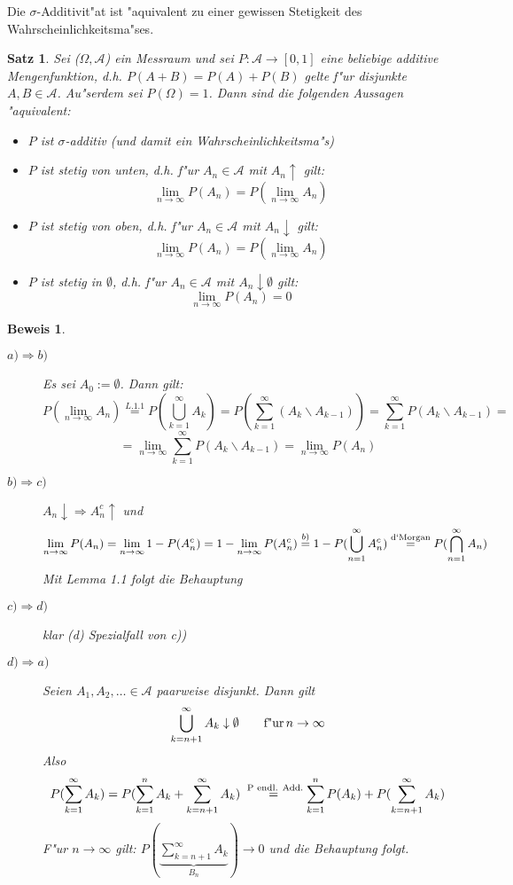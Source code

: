 \documentclass[a4paper,11pt]{book}
\def\AA{ \mathcal{A} }
\newtheorem{Sa}{Satz}[chapter]
\theoremstyle{nonumberplain}
\newtheorem{Bew}{Beweis}
\begin{document}
Die $\sigma$-Additivit"at ist "aquivalent zu einer gewissen Stetigkeit des Wahrscheinlichkeitsma"ses.

\begin{Sa}
Sei ($\Omega,\AA$) ein Messraum und sei $P:\AA\rightarrow [0,1]$ eine beliebige additive Mengenfunktion, d.h. $P(A+B)=P(A)+P(B)$ gelte f"ur disjunkte $A,B \in \AA$. Au"serdem sei $P(\Omega)=1$. Dann sind die folgenden Aussagen "aquivalent:
\begin{itemize}
	\item [a)] $P$ ist $\sigma$-additiv (und damit ein Wahrscheinlichkeitsma"s)
	\item [b)] $P$ ist stetig von unten, d.h. f"ur $A_n \in \AA$ mit $A_n \uparrow$ gilt: \\
	\[\lim_{n\to\infty} P(A_n) = P(\lim_{n\to\infty} A_n)\]
	\item [c)] $P$ ist stetig von oben, d.h. f"ur $A_n \in \AA$ mit $A_n \downarrow$ gilt: \\
	\[\lim_{n\to\infty} P(A_n) = P(\lim_{n\to\infty} A_n)\]
	\item [d)] $P$ ist stetig in $\emptyset$, d.h. f"ur $A_n \in \AA$ mit $A_n \downarrow \emptyset$ gilt: \\
	\[\lim_{n\to\infty} P(A_n)=0\]
	\end{itemize}
\end{Sa}

\begin{Bew}
\begin{description}
	\item[$a)\Rightarrow b)$] Es sei $A_0 := \emptyset$. Dann gilt:
	\[P(\lim_{n\to\infty} A_n) \stackrel{L.1.1}{=} P(\bigcup_{k=1}^{\infty}A_k)= P(\sum_{k=1}^{\infty}(A_k \backslash A_{k-1})) = \sum_{k=1}^{\infty}P(A_k\backslash A_{k-1}) =\]
\[ =\lim_{n\to\infty} \sum_{k=1}^{\infty}P(A_k\backslash A_{k-1}) = \lim_{n\to\infty} P(A_n)\]
	\item[$b)\Rightarrow c)$] $A_n \downarrow \Rightarrow A_n^c \uparrow$ und \\
	\[\lim_{n\to\infty} P(A_n) = \lim_{n\to\infty} 1-P(A_n^c) = 1-\lim_{n\to\infty} P(A_n^c)\stackrel{b)}{=} 1-P(\bigcup_{n=1}^{\infty}A_n^c) \stackrel{\textnormal{d`Morgan}}{=} P(\bigcap_{n=1}^{\infty}A_n)\]
	 Mit Lemma 1.1 folgt die Behauptung
	\item[$c)\Rightarrow d)$] klar (d) Spezialfall von c))
	\item[$d)\Rightarrow a)$] Seien $A_1,A_2,\ldots \in \AA$ paarweise disjunkt. Dann gilt \\
	\[\bigcup_{k=n+1}^{\infty} A_k \downarrow\emptyset\qquad \textnormal{f"ur}\, n\rightarrow \infty\] Also 
	\[P(\sum_{k=1}^{\infty} A_k) = P(\sum_{k=1}^{n} A_k +\sum_{k=n+1}^{\infty} A_k) \stackrel{\textnormal{ P endl. Add.}}{=} \sum_{k=1}^{n} P(A_k) + P(\sum_{k=n+1}^{\infty} A_k)\]
	F"ur $n\rightarrow \infty$ gilt: $P(\underbrace{\sum_{k=n+1}^{\infty}A_k}_{B_n}) \rightarrow 0$ und die Behauptung folgt.
\end{description}
\end{Bew}
\end{document}
